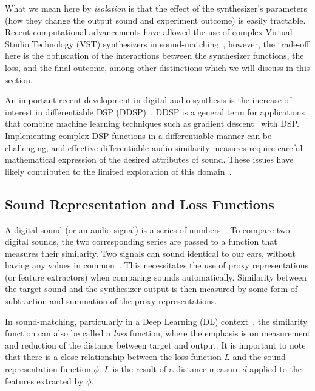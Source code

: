 \documentclass[lettersize,journal]{IEEEtran}
\newcommand{\highlight}[1]{\textcolor[RGB]{00,100,100}{#1}}
\providecommand{\gls}[1]{#1}
\begin{document}
\highlight{
What we mean here by \textit{isolation} is that the effect of the synthesizer's parameters (how they change the output sound and experiment outcome) is easily tractable. Recent computational advancements have allowed the use of complex Virtual Studio Technology (VST)\cite{steinberg1996vst} synthesizers in sound-matching~\cite{yee2018automatic,esling2019flow}, however, the trade-off here is the obfuscation of the interactions between the synthesizer functions, the loss, and the final outcome, among other distinctions which we will discuss in this section. 
}

An important recent development in digital audio synthesis is the increase of interest in differentiable DSP (\gls{DDSP})~\cite{engel2020ddsp}. DDSP is a general term for applications that combine machine learning techniques such as gradient descent~\cite{goodfellow2016deep,boyd2004convex} with DSP. Implementing complex DSP functions in a differentiable manner can be challenging, and effective differentiable audio similarity measures require careful mathematical expression of the desired attributes of sound. These issues have likely contributed to the limited exploration of this domain~\cite{masuda2021soundmatch,vahidi2023mesostructures,uzrad2024diffmoog}. 


\subsection{Sound Representation and Loss Functions}
\label{sec:loss_funcs}
A digital sound (or an audio signal) is a series of numbers~\cite{smith1991viewpoints,smith2007mathematics}. To compare two digital sounds, the two corresponding series are passed to a function that measures their similarity. Two signals can sound identical to our ears, without having any values in common~\cite{moore2012introduction}. This necessitates the use of proxy representations (or feature extractors) when comparing sounds automatically. Similarity between the target sound and the synthesizer output is then measured by some form of subtraction and summation of the proxy representations.

In sound-matching, particularly in a Deep Learning (\gls{DL}) context~\cite{goodfellow2016deep}, the similarity function can also be called a \textit{loss} function, where the emphasis is on measurement and reduction of the distance between target and output. It is important to note that there is a close relationship between the loss function $L$ and the sound representation function $\phi$. $L$ is the result of a distance measure $d$ applied to the features extracted by $\phi$. 
\end{document}
